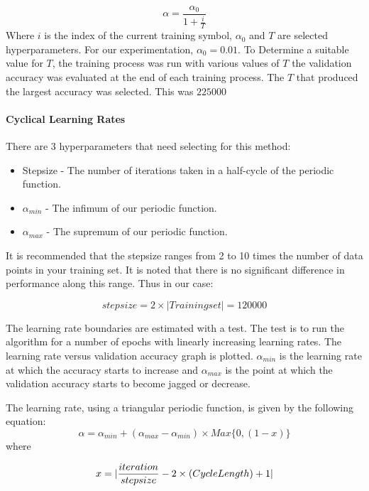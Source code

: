 \documentclass{article}
\begin{document}
\begin{equation}
	\alpha = \frac{\alpha_0}{1 + \frac{i}{T}}
\end{equation}
Where $i$ is the index of the current training symbol, $\alpha_0$ and $T$ are selected hyperparameters. For our experimentation, $\alpha_0 = 0.01$. To Determine a suitable value for $T$,  the training process was run with various values of $T$ the validation accuracy was evaluated at the end of each training process. The $T$ that produced the largest accuracy was selected. This was $225000$  
\paragraph{Cyclical Learning Rates}
There are 3 hyperparameters that need selecting for this method:
\begin{itemize}
	\item Stepsize - The number of iterations taken in a half-cycle of the periodic function.
	\item $\alpha_{min}$ - The infimum of our periodic function.
	\item $\alpha_{max}$ - The supremum of our periodic function.
\end{itemize}

It is recommended that the stepsize ranges from 2 to 10 times the number of data points in your training set. It is noted that there is no significant difference in performance along this range.
Thus in our case:

\begin{equation}
stepsize = 2 \times |Training set| = 120000
\end{equation}

The learning rate boundaries are estimated with a test. The test is to run the algorithm for a number of epochs with linearly increasing learning rates. The learning rate versus validation accuracy graph is plotted. $\alpha_{min}$ is the learning rate at which the accuracy starts to increase and $\alpha_{max}$ is the point at which the validation accuracy starts to become jagged or decrease.

The learning rate, using a triangular periodic function, is given by the following equation:
\begin{equation}
	\alpha = \alpha_{min} + (\alpha_{max} - \alpha_{min})\times Max\{0, (1-x)\}
\end{equation}
where 

\begin{equation}
	x = |\frac{iteration}{stepsize} -2\times{(Cycle \space Length)} + 1|
\end{equation}
\end{document}
